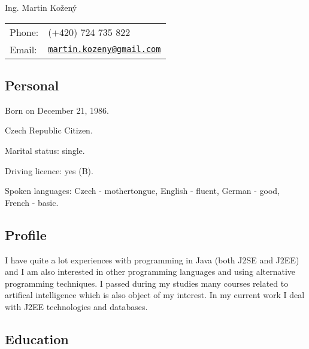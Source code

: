 \documentclass[czech]{article}
\def\name{Ing. Martin Kožený}
\renewenvironment{itemize}{
  \begin{list}{}{
    \setlength{\leftmargin}{1.5em}
  }
}{
  \end{list}
}
\begin{document}
{\huge \name}


\vspace{0.1in}

\begin{minipage}{0.45\linewidth}
  \begin{tabular}{ll}
    Phone: & (+420) 724 735 822 \\
    Email: & \href{mailto:martin.kozeny@gmail.com}{\tt martin.kozeny@gmail.com}
    
  \end{tabular}
\end{minipage}

\textcolor{coolblack}{\section*{Personal}}

\begin{itemize}
\item Born on December 21, 1986.
\item Czech Republic Citizen.
\item Marital status: single.
\item Driving licence: yes (B).
\item Spoken languages: Czech - mothertongue, English - fluent, German - good,
French - basic.
\end{itemize}

\textcolor{coolblack}{\section*{Profile}}
I have quite a lot experiences with programming in Java (both J2SE and J2EE)
and I am also interested in other programming languages and using alternative
programming techniques. I passed during my studies many courses related to
artifical intelligence which is also object of my interest. In my current work I
deal with J2EE technologies and databases.

\textcolor{coolblack}{\section*{Education}}
\end{document}
